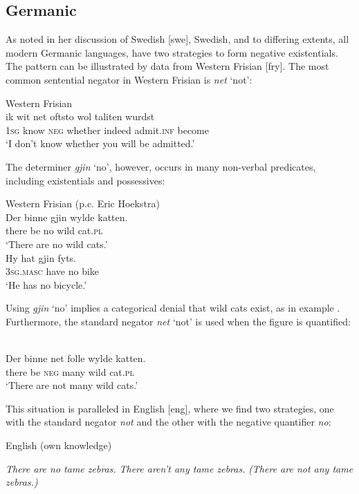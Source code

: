 ﻿\documentclass[output=paper]{langsci/langscibook}
\begin{document}
\subsection{Germanic}\label{sec:ieur-4.5}


As \citet[114--115]{Veselinova2013} noted in her discussion of
Swedish [swe], Swedish, and to differing extents, all modern
Germanic languages, have two strategies to form negative
existentials. The pattern can be illustrated by data from Western
Frisian [fry]. The most common sentential negator in Western Frisian is \textit{net} `not':
%
\begin{exe}\ex
Western Frisian \citep[91]{Tiersma1999}\\
    \gll ik    wit     net   oftsto     wol      taliten      wurdst \\
\textsc{1sg} know \textsc{neg} whether indeed admit.\textsc{inf} become\\
    \glt `I don't know whether you will be admitted.' 
    \end{exe}
%
The determiner \textit{gjin} `no', however, occurs in many non-verbal predicates, including existentials and possessives:
%
\begin{exe}\ex\label{ex:ieur-frisian-nowildcatsnow}
Western Frisian (p.c. Eric Hoekstra)\\
    \gll Der   binne gjin wylde katten. \\
there be       no   wild   cat.\textsc{pl} \\
    \glt `There are no wild cats.' 
\ex
{}\\
    \gll Hy hat   gjin fyts. \\
  \textsc{3sg.masc} have no   bike \\
    \glt `He has no bicycle.'
    \end{exe} 
%
Using \textit{gjin} `no' implies a categorical denial that wild cats exist, as in example . Furthermore, the standard negator \textit{net} `not' is used when the figure is quantified:
%
\begin{exe}\ex
{}\\
    \gll Der   binne  net   folle  wylde katten. \\
there be       \textsc{neg} many wild   cat.\textsc{pl} \\
    \glt `There are not many wild cats.' 
    \end{exe}
%
This situation is paralleled in English [eng], where we find two strategies, one with the standard negator \textit{not} and the other with the negative quantifier \textit{no}:
%
\begin{exe}\ex English (own knowledge)\begin{xlist}
        \ex\label{ex:ieur-english-no-tame-zebras}
     \textit{There are no tame zebras.}
\ex \textit{There aren’t any tame zebras.} \textit{(There are not any tame zebras.)}
    \end{xlist}\end{exe}
\end{document}

